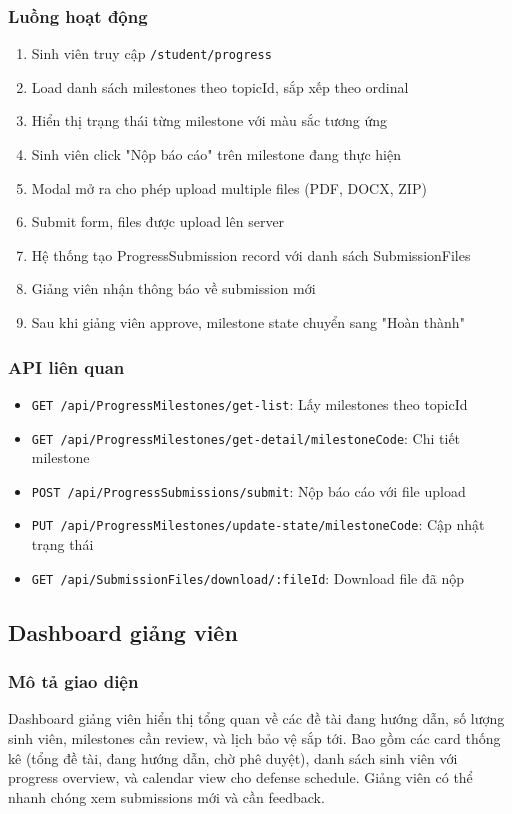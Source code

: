 \documentclass[conference,a4paper]{IEEEtran}
\begin{document}
\subsubsection{Luồng hoạt động}
\begin{enumerate}
  \item Sinh viên truy cập \texttt{/student/progress}
  \item Load danh sách milestones theo topicId, sắp xếp theo ordinal
  \item Hiển thị trạng thái từng milestone với màu sắc tương ứng
  \item Sinh viên click "Nộp báo cáo" trên milestone đang thực hiện
  \item Modal mở ra cho phép upload multiple files (PDF, DOCX, ZIP)
  \item Submit form, files được upload lên server
  \item Hệ thống tạo ProgressSubmission record với danh sách SubmissionFiles
  \item Giảng viên nhận thông báo về submission mới
  \item Sau khi giảng viên approve, milestone state chuyển sang "Hoàn thành"
\end{enumerate}

\subsubsection{API liên quan}
\begin{itemize}
  \item \texttt{GET /api/ProgressMilestones/get-list}: Lấy milestones theo topicId
  \item \texttt{GET /api/ProgressMilestones/get-detail/\newline milestoneCode}: Chi tiết milestone
  \item \texttt{POST /api/ProgressSubmissions/submit}: Nộp báo cáo với file upload
  \item \texttt{PUT /api/ProgressMilestones/update-state/\newline milestoneCode}: Cập nhật trạng thái
  \item \texttt{GET /api/SubmissionFiles/download/:fileId}: Download file đã nộp
\end{itemize}

\subsection{Dashboard giảng viên}
\subsubsection{Mô tả giao diện}
Dashboard giảng viên hiển thị tổng quan về các đề tài đang hướng dẫn, số lượng sinh viên, milestones cần review, và lịch bảo vệ sắp tới. Bao gồm các card thống kê (tổng đề tài, đang hướng dẫn, chờ phê duyệt), danh sách sinh viên với progress overview, và calendar view cho defense schedule. Giảng viên có thể nhanh chóng xem submissions mới và cần feedback.
\end{document}

